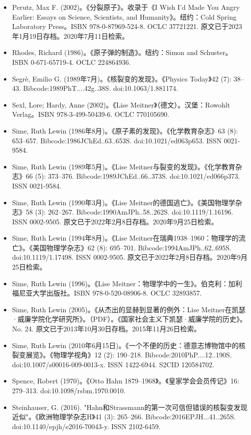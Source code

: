 \begin{itemize}
\item Perutz, Max F. (2002)。《分裂原子》。收录于《I Wish I'd Made You Angry Earlier: Essays on Science, Scientists, and Humanity》。纽约：Cold Spring Laboratory Press。ISBN 978-0-87969-524-8. OCLC 37721221. 原文已于2023年1月19日存档。2020年7月11日检索。
\item Rhodes, Richard (1986)。《原子弹的制造》。纽约：Simon and Schuster。ISBN 0-671-65719-4. OCLC 224864936.
\item Segrè, Emilio G. (1989年7月)。《核裂变的发现》。《Physics Today》42 (7): 38–43. Bibcode:1989PhT....42g..38S. doi:10.1063/1.881174.
\item Sexl, Lore; Hardy, Anne (2002)。《Lise Meitner》（德文）。汉堡：Rowohlt Verlag。ISBN 978-3-499-50439-6. OCLC 770105690.
\item Sime, Ruth Lewin (1986年8月)。《原子素的发现》。《化学教育杂志》63 (8): 653–657. Bibcode:1986JChEd..63..653S. doi:10.1021/ed063p653. ISSN 0021-9584.
\item Sime, Ruth Lewin (1989年5月)。《Lise Meitner与裂变的发现》。《化学教育杂志》66 (5): 373–376. Bibcode:1989JChEd..66..373S. doi:10.1021/ed066p373. ISSN 0021-9584.
\item Sime, Ruth Lewin (1990年3月)。《Lise Meitner的德国逃亡》。《美国物理学杂志》58 (3): 262–267. Bibcode:1990AmJPh..58..262S. doi:10.1119/1.16196. ISSN 0002-9505. 原文已于2022年2月8日存档。2020年9月25日检索。
\item Sime, Ruth Lewin (1994年8月)。《Lise Meitner在瑞典1938–1960：物理学的流亡》。《美国物理学杂志》62 (8): 695–701. Bibcode:1994AmJPh..62..695S. doi:10.1119/1.17498. ISSN 0002-9505. 原文已于2022年2月8日存档。2020年9月25日检索。
\item Sime, Ruth Lewin (1996)。《Lise Meitner：物理学中的一生》。伯克利：加利福尼亚大学出版社。ISBN 978-0-520-08906-8. OCLC 32893857.
\item Sime, Ruth Lewin (2005)。《从杰出的显赫到显著的例外：Lise Meitner在凯瑟·威廉学院化学研究所》。（PDF）。《国家社会主义下凯瑟·威廉学院的历史》。No. 24. 原文已于2013年10月30日存档。2015年11月26日检索。
\item Sime, Ruth Lewin (2010年6月15日)。《一个不便的历史：德意志博物馆中的核裂变展览》。《物理学视角》12 (2): 190–218. Bibcode:2010PhP....12..190S. doi:10.1007/s00016-009-0013-x. ISSN 1422-6944. S2CID 120584702.
\item Spence, Robert (1970)。《Otto Hahn 1879–1968》。《皇家学会会员传记》16: 279–313. doi:10.1098/rsbm.1970.0010.
\item Steinhauser, G. (2016). "Hahn和Strassmann的第一次可信但错误的核裂变发现近似"。《欧洲物理学杂志H》41 (3): 265–266. Bibcode:2016EPJH...41..265S. doi:10.1140/epjh/e2016-70043-y. ISSN 2102-6459.

\end{itemize}
